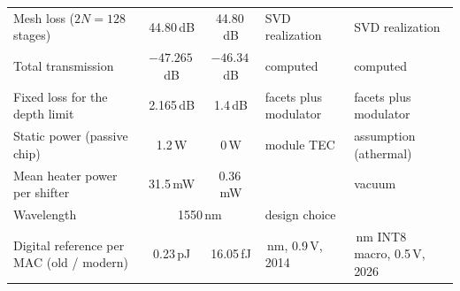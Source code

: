 \documentclass[11pt,a4paper]{article}
\newcommand{\dB}{\,dB\xspace}
\newcommand{\fJ}{\,fJ\xspace}
\begin{document}
\begin{table}[htbp]
\begin{tabular}{@{}>{\raggedright\arraybackslash}p{3.2cm}cc>{\raggedright\arraybackslash}p{4.2cm}>{\raggedright\arraybackslash}p{3.8cm}@{}}
Mesh loss ($2N=128$ stages) & 44.80\dB & 44.80\dB & SVD realization & SVD realization \\
Total transmission & $-47.265$\dB & $-46.34$\dB & computed & computed \\
Fixed loss for the depth limit & 2.165\dB & 1.4\dB & facets plus modulator & facets plus modulator \\
Static power (passive chip) & 1.2\,W & 0\,W & module TEC \cite{Hsu2026} & assumption (athermal) \\
Mean heater power per shifter & 31.5\,mW & 0.36\,mW & \cite{Pentangelo2024} & vacuum \cite{Ceccarelli2020} \\
Wavelength & \multicolumn{2}{c}{1550\,nm} & \multicolumn{2}{l}{design choice} \\
Digital reference per MAC (old / modern) & 0.23\,pJ & 16.05\fJ & 45\,nm, 0.9\,V, 2014 \cite{Horowitz2014} & 3\,nm INT8 macro, 0.5\,V, 2026 \cite{Mori2026} \\
\bottomrule
\end{tabular}
\end{table}
\end{document}
